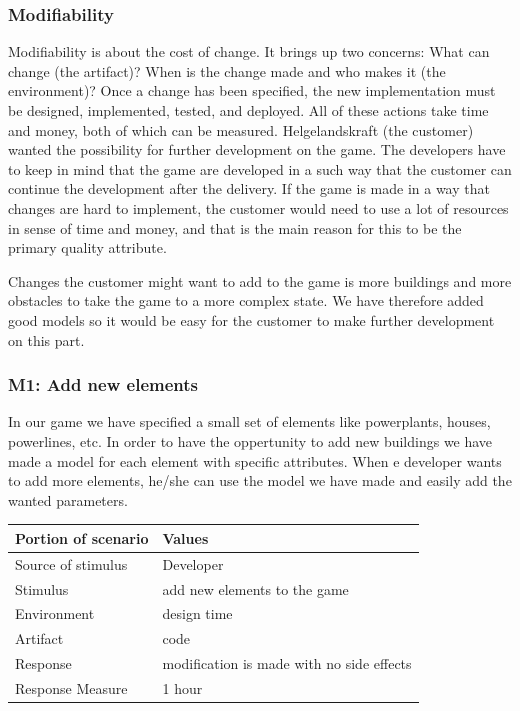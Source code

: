 \subsubsection{Modifiability}

Modifiability is about the cost of change. It brings up two concerns: What can change (the artifact)? 
When is the change made and who makes it (the environment)? 
Once a change has been specified, the new implementation must be designed, 
implemented, tested, and deployed. All of these actions take time and money, both of which can be measured.
Helgelandskraft (the customer) wanted the possibility for further development on the game. The developers
have to keep in mind that the game are developed in a such way that the customer can continue
the development after the delivery. If the game is made in a way that changes are hard to implement, 
the customer would need to use a lot of resources in sense of time and money, and that is the main 
reason for this to be the primary quality attribute.

Changes the customer might want to add to the game is more buildings and more obstacles to take
the game to a more complex state. We have therefore added good models so it would be easy for 
the customer to make further development on this part.

\subsubsection*{M1: Add new elements}
In our game we have specified a small set of elements like powerplants, houses, powerlines, etc.
In order to have the oppertunity to add new buildings we have made a model for each element
with specific attributes. When e developer wants to add more elements, he/she can use the model
we have made and easily add the wanted parameters. 

\begin{tabular}{| l | l |}
	\hline
	\rowcolor{gray}
	{\bf Portion of scenario} & {\bf Values} \\ \hline
	Source of stimulus & Developer\\ \hline
	Stimulus & add new elements to the game\\ \hline
	Environment & design time \\ \hline
	Artifact &  code \\ \hline
	Response & modification is made with no side effects\\ \hline
	Response Measure & 1 hour\\ \hline
\end{tabular}

